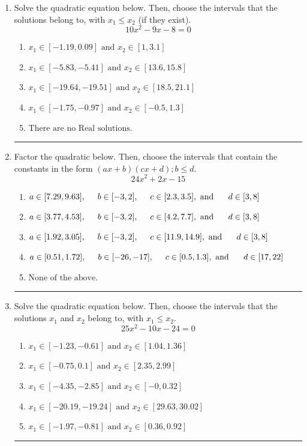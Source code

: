 \documentclass[14pt]{extbook}
\newcommand{\litem}[1]{\item#1\hspace*{-1cm}\rule{\textwidth}{0.4pt}}
\begin{document}
\begin{enumerate}
\litem{
Solve the quadratic equation below. Then, choose the intervals that the solutions belong to, with $x_1 \leq x_2$ (if they exist).\[ 10x^{2} -9 x -8 = 0 \]\begin{enumerate}[label=\Alph*.]
\item \( x_1 \in [-1.19, 0.09] \text{ and } x_2 \in [1, 3.1] \)
\item \( x_1 \in [-5.83, -5.41] \text{ and } x_2 \in [13.6, 15.8] \)
\item \( x_1 \in [-19.64, -19.51] \text{ and } x_2 \in [18.5, 21.1] \)
\item \( x_1 \in [-1.75, -0.97] \text{ and } x_2 \in [-0.5, 1.3] \)
\item \( \text{There are no Real solutions.} \)

\end{enumerate} }
\litem{
Factor the quadratic below. Then, choose the intervals that contain the constants in the form $(ax+b)(cx+d); b \leq d.$\[ 24x^{2} +2 x -15 \]\begin{enumerate}[label=\Alph*.]
\item \( a \in [7.29, 9.63], \hspace*{5mm} b \in [-3, 2], \hspace*{5mm} c \in [2.3, 3.5], \text{ and } \hspace*{5mm} d \in [3, 8] \)
\item \( a \in [3.77, 4.53], \hspace*{5mm} b \in [-3, 2], \hspace*{5mm} c \in [4.2, 7.7], \text{ and } \hspace*{5mm} d \in [3, 8] \)
\item \( a \in [1.92, 3.05], \hspace*{5mm} b \in [-3, 2], \hspace*{5mm} c \in [11.9, 14.9], \text{ and } \hspace*{5mm} d \in [3, 8] \)
\item \( a \in [0.51, 1.72], \hspace*{5mm} b \in [-26, -17], \hspace*{5mm} c \in [0.5, 1.3], \text{ and } \hspace*{5mm} d \in [17, 22] \)
\item \( \text{None of the above.} \)

\end{enumerate} }
\litem{
Solve the quadratic equation below. Then, choose the intervals that the solutions $x_1$ and $x_2$ belong to, with $x_1 \leq x_2$.\[ 25x^{2} -10 x -24 = 0 \]\begin{enumerate}[label=\Alph*.]
\item \( x_1 \in [-1.23, -0.61] \text{ and } x_2 \in [1.04, 1.36] \)
\item \( x_1 \in [-0.75, 0.1] \text{ and } x_2 \in [2.35, 2.99] \)
\item \( x_1 \in [-4.35, -2.85] \text{ and } x_2 \in [-0, 0.32] \)
\item \( x_1 \in [-20.19, -19.24] \text{ and } x_2 \in [29.63, 30.02] \)
\item \( x_1 \in [-1.97, -0.81] \text{ and } x_2 \in [0.36, 0.92] \)


\end{enumerate}}
\end{enumerate}
\end{document}

